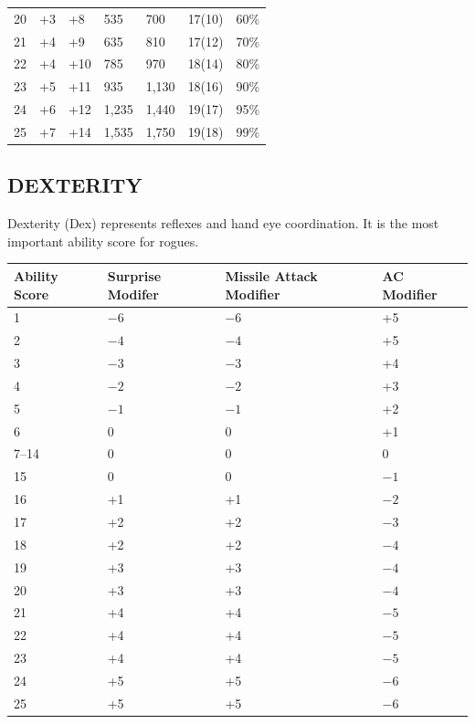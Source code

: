 \begin{minipage}{\columnwidth}
\begin{tabular}{|m{}|m{}|m{}|m{}|m{}|m{}|m{}|}
\rowcolor[gray]{.9}20		& +3	& +8	& 535	& 700	& 17(10)	& 60\% \\
21		& +4	& +9	& 635	& 810	& 17(12)	& 70\% \\
\rowcolor[gray]{.9}22		& +4	& +10	& 785	& 970	& 18(14)	& 80\% \\
23		& +5	& +11	& 935	& 1,130	& 18(16)	& 90\% \\
\rowcolor[gray]{.9}24		& +6	& +12	& 1,235	& 1,440	& 19(17)	& 95\% \\
25		& +7	& +14	& 1,535	& 1,750	& 19(18)	& 99\% \\
\hline
\end{tabular}

\end{minipage}

\begin{multicols}{2}

\section{DEXTERITY}

Dexterity (Dex) represents reflexes and hand eye coordination.  It is the most important ability score for rogues.  

\noindent
\begin{minipage}{\columnwidth}

\label{dexterityscores}
\noindent
\begin{tabular}{|m{}|m{}|m{}|m{}|}
\hline
Ability Score	& Surprise Modifer	& Missile Attack Modifier		& AC Modifier \\
\hline\hline
\rowcolor[gray]{.9}1	& $-6$	& $-6$	& +5 \\
2	& $-4$	& $-4$	& +5 \\
\rowcolor[gray]{.9}3	& $-3$	& $-3$	& +4 \\
4	& $-2$	& $-2$	& +3 \\
\rowcolor[gray]{.9}5	& $-1$	& $-1$	& +2 \\
6	& 0		& 0		& +1 \\
\rowcolor[gray]{.9}7--14	& 0	& 0		& 0 \\
15	& 0		& 0		& $-1$ \\
\rowcolor[gray]{.9}16	& +1	& +1	& $-2$ \\
17	& +2	& +2	& $-3$ \\
\rowcolor[gray]{.9}18	& +2	& +2	& $-4$ \\
19	& +3	& +3	& $-4$ \\
\rowcolor[gray]{.9}20	& +3	& +3	& $-4$ \\
21	& +4	& +4	& $-5$ \\
\rowcolor[gray]{.9}22	& +4	& +4	& $-5$ \\
23	& +4	& +4	& $-5$ \\
\rowcolor[gray]{.9}24	& +5	& +5	& $-6$ \\
25	& +5	& +5	& $-6$ \\
\hline
\end{tabular}


\end{minipage}
\end{multicols}
